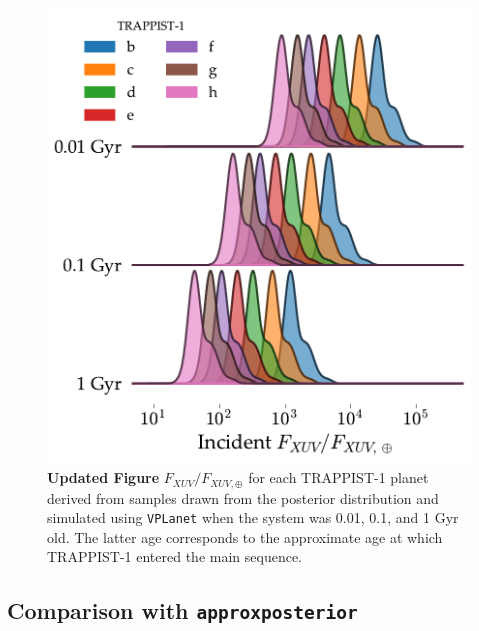 \documentclass[twocolumn]{aastex62}
\newcommand{\xxx}[1]{{\textbf{#1}}}
\newcommand{\vplanet}[0]{\texttt{VPLanet}\xspace}
\newcommand{\approxposterior}[0]{\texttt{approxposterior}\xspace}
\begin{document}
\begin{figure}
	\includegraphics[width=\columnwidth]{../Analysis/Fluxes/fluxes.pdf}
   \caption{\xxx{Updated Figure} $F_{XUV}/F_{XUV,\oplus}$ for each TRAPPIST-1 planet derived from samples drawn from the posterior distribution and simulated using \vplanet when the system was 0.01, 0.1, and 1 Gyr old. The latter age corresponds to the approximate age at which TRAPPIST-1 entered the main sequence.}%
    \label{fig:fluxes}%
\end{figure}


\subsection{Comparison with \approxposterior} \label{sec:approx}

\end{document}
